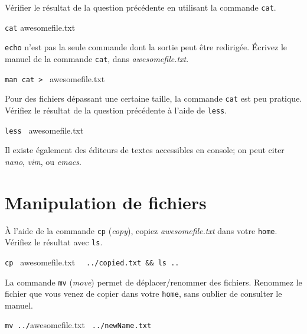 \documentclass{scrartcl}
\newcommand{\tutoFileName}{awesomefile.txt}
\begin{document}
\begin{question}[name=Q.]
	Vérifier le résultat de la question précédente en utilisant la commande \lstinline|cat|.
\end{question}
\begin{solution}
	\lstinline|cat| \tutoFileName
\end{solution}

\begin{question}[name=Q.]
	\lstinline|echo| n'est pas la seule commande dont la sortie peut être redirigée. Écrivez le manuel de la commande \lstinline|cat|, dans \emph{\tutoFileName}. 
\end{question}
\begin{solution}
	\lstinline|man cat > | \tutoFileName
\end{solution}

\begin{question}[name=Q.]
	Pour des fichiers dépassant une certaine taille, la commande \lstinline|cat| est peu pratique. Vérifiez le résultat de la question précédente à l'aide de \lstinline|less|. 
\end{question}
\begin{solution}
	\lstinline|less | \tutoFileName
	\clearpage
\end{solution}

Il existe également des éditeurs de textes accessibles en console; on peut citer \textit{nano}, \textit{vim}, ou \textit{emacs}.

\section{Manipulation de fichiers}

\begin{question}[name=Q.]
	À l'aide de la commande \lstinline|cp| (\emph{copy}), copiez \emph{\tutoFileName} dans votre \lstinline|home|. Vérifiez le résultat avec \lstinline|ls|.
\end{question}
\begin{solution}
	\lstinline|cp | \tutoFileName ~ \lstinline| ../copied.txt && ls ..|
\end{solution}

\begin{question}[name=Q.]
	La commande \lstinline|mv| (\emph{move}) permet de déplacer/renommer des fichiers. Renommez le fichier que vous venez de copier dans votre \lstinline|home|, sans oublier de consulter le manuel.
\end{question}
\begin{solution}
	\lstinline|mv ../|\tutoFileName \lstinline| |  \lstinline|../newName.txt|
\end{solution}
\end{document}
